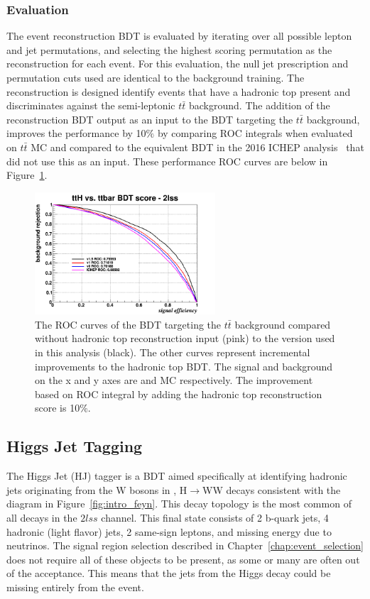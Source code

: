 \subsubsection{Evaluation}

The event reconstruction BDT is evaluated by iterating over all possible lepton and jet
permutations, and selecting the highest scoring permutation as the reconstruction for
each event. For this evaluation, the null jet prescription and permutation
cuts used are identical to the background training.
The reconstruction is designed identify events that have a hadronic top present and
discriminates against the semi-leptonic $t\bar{t}$ background. The addition of the 
reconstruction BDT output as an input to the BDT targeting the $t\bar{t}$ background,
improves the performance by 10$\%$ by comparing ROC integrals when evaluated on $t\bar{t}$ MC and compared to the
equivalent BDT in the 2016 \tth ICHEP analysis~\cite{CMS-AN-16-022} that did not use this
as an input. These performance ROC curves are below in Figure~\ref{fig:hadtop_performance}.

\begin{figure}[htb]
 \centering
   \includegraphics[width=0.6\textwidth]{ch9_figs/improvement_roc.png}
   \caption[ROC curves of $t\bar{t}$ BDT with and without hadronic top reconstruction input]{The ROC curves of the BDT targeting the $t\bar{t}$ background compared without 
   hadronic top reconstruction input (pink) to the version used in this analysis (black). The other curves represent incremental improvements to the hadronic top BDT. The signal
   and background on the x and y axes are \tth and \ttbar MC respectively. The improvement based on ROC integral by adding the hadronic top reconstruction score is 10$\%$.}
  \label{fig:hadtop_performance}
\end{figure}

\subsection{Higgs Jet Tagging}
The Higgs Jet (HJ) tagger is a BDT aimed specifically at identifying hadronic jets originating from the W bosons in \tth, H$\rightarrow$WW decays consistent
with the \tth diagram in Figure~\ref{fig:intro_feyn}. This decay topology is the most common of all \tth decays in the $2lss$ channel. This final state
consists of 2 b-quark jets, 4 hadronic (light flavor) jets, 2 same-sign leptons, and missing energy due to neutrinos. The signal region selection described
in Chapter~\ref{chap:event_selection} does not require all of these objects to be present, as some or many are often out of the acceptance. This means that
the jets from the Higgs decay could be missing entirely from the event.

